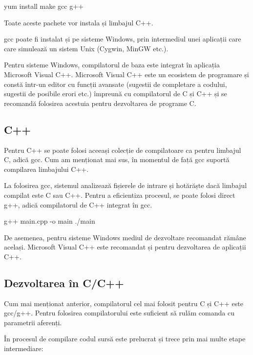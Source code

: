 \begin{screen}
yum install make gcc g++
\end{screen}

Toate aceste pachete vor instala și limbajul C++.

gcc poate fi instalat și pe sisteme Windows, prin intermediul unei aplicații
care care simulează un sistem Unix (Cygwin, MinGW etc.).

Pentru sisteme Windows, compilatorul de baza este integrat în aplicația
Microsoft Visual C++. Microsoft Visual C++ este un ecosistem de programare și
constă într-un editor cu funcții avansate (sugestii de completare a codului,
sugestii de posibile erori etc.) împreună cu compilatorul de C și C++ și se
recomandă folosirea acestuia pentru dezvoltarea de programe C.

\subsection{C++}
\label{sec:appdev-ideinstall-cpp}

Pentru C++ se poate folosi aceeași colecție de compilatoare ca pentru limbajul
C, adică gcc. Cum am menționat mai sus, în momentul de față gcc suportă
compilarea limbajului C++.

La folosirea gcc, sistemul analizează fișierele de intrare și hotărăște dacă
limbajul compilat este C sau C++. Pentru a eficientiza procesul, se poate folosi
direct g++, adică compilatorul de C++ integrat în gcc.

\begin{screen}
g++ main.cpp -o main
./main
\end{screen}

De asemenea, pentru sisteme Windows mediul de dezvoltare recomandat rămâne
același. Microsoft Visual C++ este recomandat și pentru dezvoltarea de aplicații
C++.

\subsection{Dezvoltarea în C/C++}
\label{sec:appdev-ideinstall-c-dev}

Cum mai menționat anterior, compilatorul cel mai folosit pentru C și C++ este
gcc/g++. Pentru folosirea compilatorului este suficient să rulăm comanda
 cu parametrii aferenți.

În procesul de compilare codul sursă este prelucrat și trece prin mai multe
etape intermediare:

